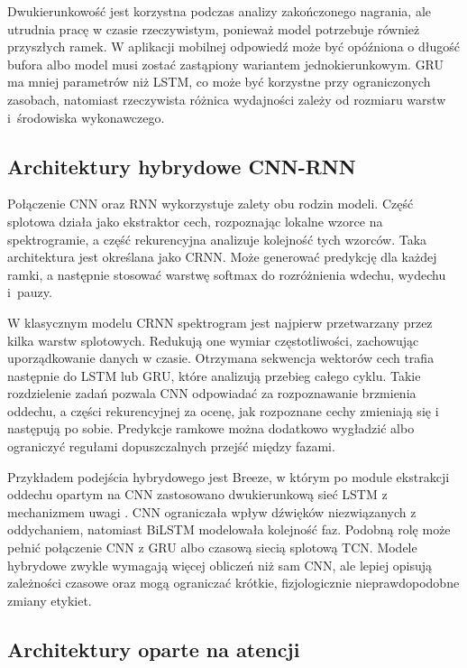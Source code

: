 Dwukierunkowość jest korzystna podczas analizy zakończonego nagrania, ale utrudnia pracę w czasie rzeczywistym, ponieważ model potrzebuje również przyszłych ramek. W aplikacji mobilnej odpowiedź może być opóźniona o długość bufora albo model musi zostać zastąpiony wariantem jednokierunkowym. GRU ma mniej parametrów niż LSTM, co może być korzystne przy ograniczonych zasobach, natomiast rzeczywista różnica wydajności zależy od rozmiaru warstw i~środowiska wykonawczego.

\subsection{Architektury hybrydowe CNN-RNN}

Połączenie CNN oraz RNN wykorzystuje zalety obu rodzin modeli. Część splotowa działa jako ekstraktor cech, rozpoznając lokalne wzorce na spektrogramie, a część rekurencyjna analizuje kolejność tych wzorców. Taka architektura jest określana jako CRNN. Może generować predykcję dla każdej ramki, a następnie stosować warstwę softmax do rozróżnienia wdechu, wydechu i~pauzy.

W klasycznym modelu CRNN spektrogram jest najpierw przetwarzany przez kilka warstw splotowych. Redukują one wymiar częstotliwości, zachowując uporządkowanie danych w czasie. Otrzymana sekwencja wektorów cech trafia następnie do LSTM lub GRU, które analizują przebieg całego cyklu. Takie rozdzielenie zadań pozwala CNN odpowiadać za rozpoznawanie brzmienia oddechu, a części rekurencyjnej za ocenę, jak rozpoznane cechy zmieniają się i następują po sobie. Predykcje ramkowe można dodatkowo wygładzić albo ograniczyć regułami dopuszczalnych przejść między fazami.

Przykładem podejścia hybrydowego jest Breeze, w którym po module ekstrakcji oddechu opartym na CNN zastosowano dwukierunkową sieć LSTM z mechanizmem uwagi \cite{10.1145/3369835}. CNN ograniczała wpływ dźwięków niezwiązanych z oddychaniem, natomiast BiLSTM modelowała kolejność faz. Podobną rolę może pełnić połączenie CNN z GRU albo czasową siecią splotową TCN. Modele hybrydowe zwykle wymagają więcej obliczeń niż sam CNN, ale lepiej opisują zależności czasowe oraz mogą ograniczać krótkie, fizjologicznie nieprawdopodobne zmiany etykiet.

\subsection{Architektury oparte na atencji}

